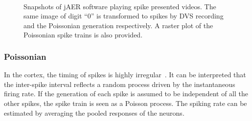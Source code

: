 \documentclass{frontiersENG} %
\begin{document}
\begin{figure}[hbt]
	\centering
	\\
	
	\caption{
		Snapshots of jAER software playing spike presented videos.
		The same image of digit ``0'' is transformed to spikes by DVS recording and the Poissonian generation respectively.
		A raster plot of the Poissonian spike trains is also provided.}
	\label{fig:zero}
\end{figure}

\subsubsection{Poissonian}

In the cortex, the timing of spikes is highly irregular~\citep{squire1998findings}.
It can be interpreted that the inter-spike interval reflects a random process driven by the instantaneous firing rate.
If the generation of each spike is assumed to be independent of all the other spikes, the spike train is seen as a Poisson process.
The spiking rate can be estimated by averaging the pooled responses of the neurons.
\end{document}
